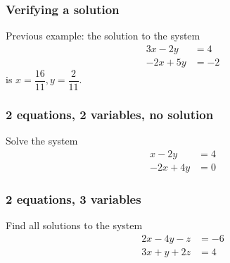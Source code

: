 \documentclass[12pt,t]{beamer}
\begin{document}
\begin{frame}\frametitle{Verifying a solution}
 Previous example: the solution to the system
\begin{align*}
    3x-2y& = 4\\
 -2x+5y& = -2                                               
\end{align*}
is $x=\dfrac{16}{11}, y = \dfrac{2}{11}$.

\end{frame}

\begin{frame}\frametitle{2 equations, 2 variables, no solution}
 \begin{example}
  Solve the system
\begin{align*}
 x-2y& = 4\\
 -2x+4y& = 0
\end{align*}

 \end{example}

\end{frame}
\begin{frame}\frametitle{2 equations, 3 variables}
 \begin{example}
  Find all solutions to the system
\begin{align*}
 2x-4y-z &= -6\\
 3x+y+2z &= 4
\end{align*}

 \end{example}

\end{frame}
\end{document}
